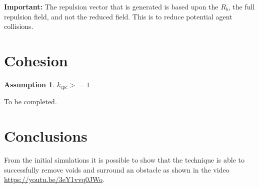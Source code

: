 \documentclass[12pt]{article}
\newtheorem{assumption}{Assumption}
\newcommand{\important}[1]{\begin{importantBox} \textbf{Important:} #1 \end{importantBox}}
\begin{document}
\important{The repulsion vector that is generated is based upon the $R_b$, the full repulsion field, and not the reduced field. This is to reduce potential agent collisions.}

\section{Cohesion}\label{cohesion}

\begin{assumption}
	$k_{cpc} >= 1$
\end{assumption}

To be completed.

\section{Conclusions}\label{conclusions}
From the initial simulations it is possible to show that the technique is able to successfully remove voids and surround an obstacle as shown in the video \href{https://youtu.be/3eY1vvq0JWo}{https://youtu.be/3eY1vvq0JWo}.



\end{document}
